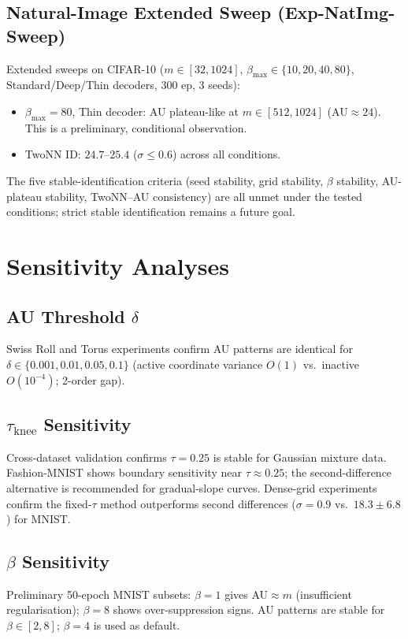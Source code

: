 \documentclass[11pt,a4paper]{article}
\begin{document}
\subsection{Natural-Image Extended Sweep (Exp-NatImg-Sweep)}

Extended sweeps on CIFAR-10 ($m\in[32,1024]$, $\beta_{\max}\in\{10,20,40,80\}$,
Standard/Deep/Thin decoders, 300 ep, 3 seeds):
\begin{itemize}
\item $\beta_{\max}=80$, Thin decoder: AU plateau-like at $m\in[512,1024]$
  (AU$\approx24$). This is a preliminary, conditional observation.
\item TwoNN ID: $24.7$--$25.4$ ($\sigma\leq0.6$) across all conditions.
\end{itemize}
The five stable-identification criteria (seed stability, grid stability,
$\beta$ stability, AU-plateau stability, TwoNN--AU consistency) are all unmet
under the tested conditions; strict stable identification remains a future goal.

\section{Sensitivity Analyses}\label{app:sensitivity}

\subsection{AU Threshold $\delta$}\label{app:delta}
Swiss Roll and Torus experiments confirm AU patterns are identical for
$\delta\in\{0.001,0.01,0.05,0.1\}$ (active coordinate variance $O(1)$
vs.\ inactive $O(10^{-4})$; 2-order gap).

\subsection{$\tau_{\mathrm{knee}}$ Sensitivity}\label{app:tau_knee}

Cross-dataset validation confirms $\tau=0.25$ is stable for Gaussian
mixture data.  Fashion-MNIST shows boundary sensitivity near $\tau\approx0.25$;
the second-difference alternative is recommended for gradual-slope curves.
Dense-grid experiments confirm the fixed-$\tau$ method outperforms second
differences ($\sigma=0.9$ vs.\ $18.3\pm6.8$) for MNIST.

\subsection{$\beta$ Sensitivity}\label{app:beta}
Preliminary 50-epoch MNIST subsets: $\beta=1$ gives AU$\approx m$
(insufficient regularisation); $\beta=8$ shows over-suppression signs.
AU patterns are stable for $\beta\in[2,8]$; $\beta=4$ is used as default.
\end{document}
